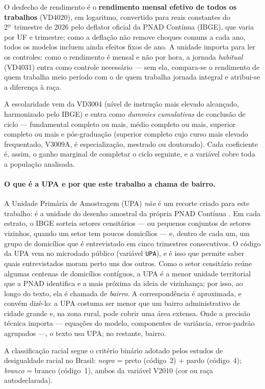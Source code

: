 \documentclass[12pt, a4paper, oneside]{article}
\begin{document}
O desfecho de rendimento é o \textbf{rendimento mensal efetivo de todos os
trabalhos} (VD4020), em logaritmo, convertido para reais constantes do 2º~trimestre
de 2026 pelo deflator oficial da PNAD Contínua (IBGE), que varia por UF e trimestre;
como a deflação não remove choques comuns a cada ano, todos os modelos incluem ainda
efeitos fixos de ano. A unidade importa para ler os controles: como
o rendimento é mensal e não por hora, a jornada \emph{habitual} (VD4031) entra como
controle necessário --- sem ela, compara-se o rendimento de quem trabalha meio período com
o de quem trabalha jornada integral e atribui-se a diferença à raça.

A escolaridade vem da VD3004 (nível de instrução mais elevado alcançado, harmonizado
pelo IBGE) e entra como \textit{dummies} \emph{cumulativas} de conclusão de ciclo
--- fundamental completo ou mais, médio completo ou mais, superior completo ou mais e
pós-graduação (superior completo cujo curso mais elevado frequentado, V3009A, é
especialização, mestrado ou doutorado). Cada coeficiente é, assim, o ganho marginal de
completar o ciclo seguinte, e a variável cobre toda a população analisada.

\paragraph{O que é a UPA e por que este trabalho a chama de bairro.}
A Unidade Primária de Amostragem (UPA) \emph{não} é um recorte criado para este trabalho: é
a unidade do desenho amostral da própria PNAD Contínua \cite{ibge_pnad_2023}. Em cada estrato,
o IBGE sorteia setores censitários --- ou pequenos conjuntos de setores vizinhos, quando um
setor tem poucos domicílios --- e, dentro de cada um, um grupo de domicílios que é entrevistado
em cinco trimestres consecutivos. O código da UPA vem no microdado público (variável
\texttt{UPA}), e é isso que permite saber quais entrevistados moram perto uns dos outros. Como
o setor censitário reúne algumas centenas de domicílios contíguos, a UPA é a menor unidade
territorial que a PNAD identifica e a mais próxima da ideia de vizinhança; por isso, ao longo
do texto, ela é chamada de \textit{bairro}. A correspondência é aproximada, e convém dizê-lo:
a UPA costuma ser menor que um bairro administrativo de cidade grande e, na zona rural, pode
cobrir uma área extensa. Onde a precisão técnica importa --- equações do modelo, componentes de
variância, erros-padrão agrupados ---, o texto usa UPA; no restante, bairro.

A classificação racial segue o critério binário adotado pelos estudos
de desigualdade racial no Brasil: \textit{negro} = preto (código~2) +
pardo (código~4); \textit{branco} = branco (código~1), ambos da variável
V2010 (cor ou raça autodeclarada).
\end{document}
